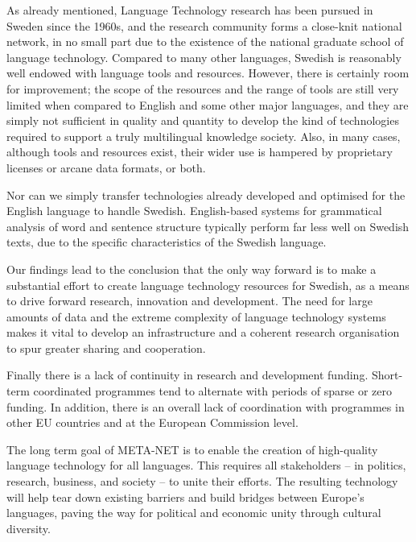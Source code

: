 \begin{multicols}{2}
As already mentioned, Language Technology research has been pursued in
Sweden since the 1960s, and the research community forms a close-knit
national network, in no small part due to the existence of the
national graduate school of language technology. Compared to many
other languages, Swedish is reasonably well endowed with language
tools and resources. However, there is certainly room for improvement;
the scope of the resources and the range of tools are still very
limited when compared to English and some other major languages, and
they are simply not sufficient in quality and quantity to develop the
kind of technologies required to support a truly multilingual
knowledge society. Also, in many cases, although tools and resources
exist, their wider use is hampered by proprietary licenses or arcane
data formats, or both.

Nor can we simply transfer technologies already developed and
optimised for the English language to handle Swedish. English-based
systems for grammatical analysis of word and sentence structure
typically perform far less well on Swedish texts, due to the specific
characteristics of the Swedish language.

Our findings lead to the conclusion that the only way forward is to make a substantial effort to create language technology resources for Swedish, as a means to drive forward research, innovation and development. The need for large amounts of data and the extreme complexity of language technology systems makes it vital to develop an infrastructure and a coherent research organisation to spur greater sharing and cooperation.

Finally there is a lack of continuity in research and development funding. Short-term coordinated programmes tend to alternate with periods of sparse or zero funding. In addition, there is an overall lack of coordination with programmes in other EU countries and at the European Commission level.

The long term goal of META-NET is to enable the creation of
high-quality language technology for all languages. This requires all
stakeholders -- in politics, research, business, and society -- to
unite their efforts. The resulting technology will help tear down
existing barriers and build bridges between Europe’s languages, paving
the way for political and economic unity through cultural diversity.
\end{multicols}

\clearpage

